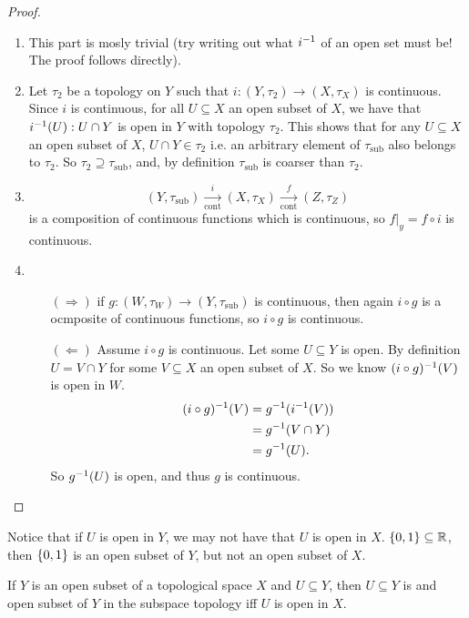 \documentclass[12pt, twosided]{article}
\begin{document}
\begin{proof}
  \begin{enumerate}
  \item This part is mosly trivial (try writing out what \(i^{-1}\) of an open set must be! The proof follows directly).
  \item Let \(\tau_2\) be a topology on \(Y\) such that \(i: (Y, \tau_2) \to (X, \tau_X)\) is continuous.
    Since \(i\) is continuous, for all \(U \subseteq X\) an open subset of \(X\), we have that \(i^{-1}(U): U \cap Y\) is open in \(Y\) with topology \(\tau_2\). This shows that for any \(U \subseteq X\) an open subset of \(X\), \(U \cap Y \in \tau_2\) i.e. an arbitrary element of \(\tau_\mathrm{sub}\) also belongs to \(\tau_2\). So \(\tau_2 \supseteq \tau_{\mathrm{sub}}\), and, by definition \(\tau_{\mathrm{sub}}\) is coarser than \(\tau_2\).
  \item \[(Y, \tau_{\mathrm{sub}}) \xrightarrow[\mathrm{cont}]{i} (X, \tau_X) \xrightarrow[\mathrm{cont}]{f} (Z, \tau_Z)\] is a composition of continuous functions which is continuous, so \(f\vert_y = f \circ i\) is continuous.
  \item
    \begin{itemize}
    \item [\((\Rightarrow)\)] if \(g: (W, \tau_W) \to (Y, \tau_{\mathrm{sub}})\) is continuous, then again \(i \circ g\) is a ocmposite of continuous functions, so \(i \circ g\) is continuous.
    \item [\((\Leftarrow)\)] Assume \(i \circ g\) is continuous. Let some \(U \subseteq Y\) is open. By definition \(U = V \cap Y\) for some \(V \subseteq X\) an open subset of \(X\). So we know \((i \circ g)^{-1} (V)\) is open in \(W\).
      \begin{align*}
        (i \circ g)^{-1}(V) &= g^{-1}(i^{-1}(V)) \\
                         &= g^{-1}(V \cap Y) \\
                         &= g^{-1}(U).
      \end{align*}
      So \(g^{-1}(U)\) is open, and thus \(g\) is continuous.
    \end{itemize}
  \end{enumerate}
\end{proof}

Notice that if \(U\) is open in \(Y\), we may not have that \(U\) is open in \(X\). \( \left\{ 0, 1 \right\} \subseteq \mathbb{R}\), then \(\left\{ 0, 1 \right\}\) is an open subset of \(Y\), but not an open subset of \(X\).

\begin{prop}
  If \(Y\) is an open subset of a topological space \(X\) and \(U \subseteq Y\), then \(U \subseteq Y\) is and open subset of \(Y\) in the subspace topology iff \(U\) is open in \(X\).
\end{prop}
\end{document}
